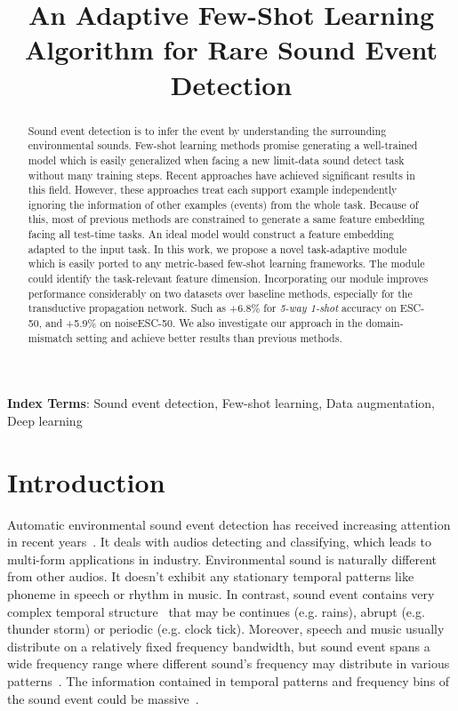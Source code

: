 \documentclass[a4paper]{article}
\title{An Adaptive Few-Shot Learning  Algorithm for Rare Sound Event Detection}
\begin{document}
\maketitle 
\begin{abstract}
  Sound event detection is to infer the event by understanding the surrounding environmental sounds. 
  Few-shot learning methods promise generating a well-trained model which is easily generalized when facing a new limit-data sound detect task without many training steps. 
  Recent approaches have achieved significant results in this field. However, these approaches treat each support example independently ignoring the information of other examples (events) from the whole task. 
  Because of this, most of previous methods are constrained to generate a same feature embedding facing all test-time tasks. An ideal model would construct a feature embedding adapted to the input task. 
  In this work, we propose a novel task-adaptive module which is easily ported to any metric-based few-shot learning frameworks. The module could identify the task-relevant feature dimension. Incorporating our module improves performance considerably on two datasets over baseline methods, especially for the transductive propagation network. Such as +6.8\% for \textit{5-way 1-shot} accuracy on ESC-50, and +5.9\% on noiseESC-50. We also investigate our approach in the domain-mismatch setting and achieve better results than previous methods.
\end{abstract} 
\noindent\textbf{Index Terms}: Sound event detection, Few-shot learning, Data augmentation, Deep learning

\section{Introduction}
\label{sec:intro}

Automatic environmental sound event detection has received increasing attention in recent years~\cite{TUTDatatbase}. It deals with audios detecting and classifying, which leads to multi-form applications in industry. Environmental sound is naturally different from other audios. It doesn't exhibit any stationary temporal patterns like phoneme in speech or rhythm in music. In contrast, sound event contains very complex temporal structure~\cite{sed1,sed2,se} that may be continues (e.g. rains), abrupt (e.g. thunder storm) or periodic (e.g. clock tick). Moreover, speech and music usually distribute on a relatively fixed frequency bandwidth, but sound event spans a wide frequency range where different sound’s frequency may distribute in various patterns~\cite{su2017weakly,pert}. The information contained in temporal patterns and frequency bins of the sound event could be massive~\cite{tf}.
\end{document}
